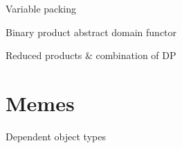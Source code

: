 \documentclass[aspectratio=169]{beamer}
\begin{document}
\begin{frame}{Variable packing}
\end{frame}

\begin{frame}{Binary product abstract domain functor}

\end{frame}

\begin{frame}{Reduced products \& combination of DP}
\end{frame}

\section{Memes}
\begin{frame}{}\end{frame}

\appendix

\begin{frame}{Dependent object types}
  
\end{frame}
\end{document}

